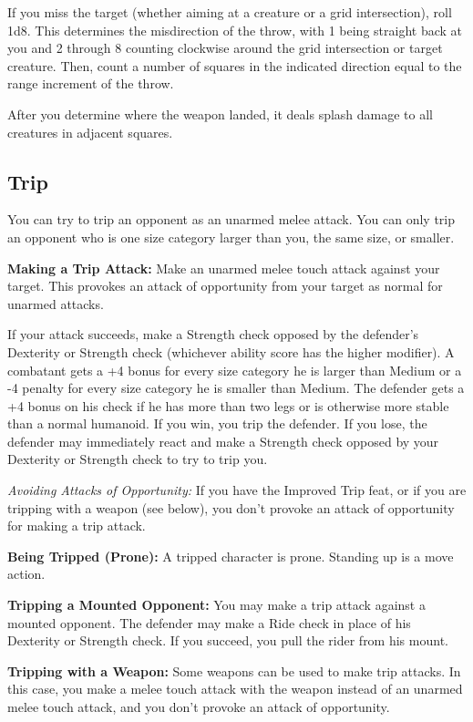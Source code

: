 If you miss the target (whether aiming at a creature or a grid intersection), roll 
1d8. This determines the misdirection of the throw, with 1 being straight back 
at you and 2 through 8 counting clockwise around the grid intersection or target 
creature. Then, count a number of squares in the indicated direction equal to the 
range increment of the throw.

After you determine where the weapon landed, it deals splash damage to all creatures 
in adjacent squares.

\subsection{Trip}

You can try to trip an opponent as an unarmed melee attack. You can only trip an 
opponent who is one size category larger than you, the same size, or smaller.

\textbf{Making a Trip Attack:} Make an unarmed melee touch attack against your 
target. This provokes an attack of opportunity from your target as normal for unarmed 
attacks.

If your attack succeeds, make a Strength check opposed by the defender's Dexterity 
or Strength check (whichever ability score has the higher modifier). A combatant 
gets a +4 bonus for every size category he is larger than Medium or a -4 penalty 
for every size category he is smaller than Medium. The defender gets a +4 bonus 
on his check if he has more than two legs or is otherwise more stable than a normal 
humanoid. If you win, you trip the defender. If you lose, the defender may immediately 
react and make a Strength check opposed by your Dexterity or Strength check to 
try to trip you.

\textit{Avoiding Attacks of Opportunity:} If you have the Improved Trip feat, or 
if you are tripping with a weapon (see below), you don't provoke an attack of opportunity 
for making a trip attack.

\textbf{Being Tripped (Prone):} A tripped character is prone. Standing up is a 
move action.

\textbf{Tripping a Mounted Opponent:} You may make a trip attack against a mounted 
opponent. The defender may make a Ride check in place of his Dexterity or Strength 
check. If you succeed, you pull the rider from his mount.

\textbf{Tripping with a Weapon:} Some weapons can be used to make trip attacks. 
In this case, you make a melee touch attack with the weapon instead of an unarmed 
melee touch attack, and you don't provoke an attack of opportunity.

